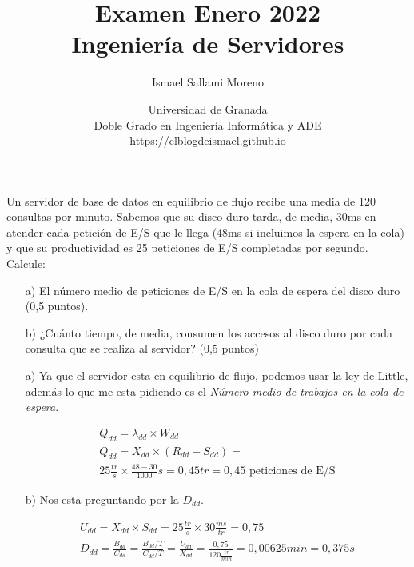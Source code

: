 \documentclass[a4paper,12pt]{article}
\title{\Huge Examen Enero 2022\vspace{0.5cm} \\ \Large Ingeniería de Servidores}
\author{Ismael Sallami Moreno}
\date{\small Universidad de Granada\\ Doble Grado en Ingeniería Informática y ADE\\ \url{https://elblogdeismael.github.io}}
\begin{document}
\maketitle
\thispagestyle{fancy}

\vspace{1cm}

\begin{tcolorbox}[colback=white!95!gray, colframe=black, title=2.- (1 punto)]
Un servidor de base de datos en equilibrio de flujo recibe una media de 120 consultas por minuto. Sabemos que su disco duro tarda, de media, 30ms en atender cada petición de E/S que le llega (48ms si incluimos la espera en la cola) y que su productividad es 25 peticiones de E/S completadas por segundo. Calcule:
\begin{enumerate}
    \item[a)] El número medio de peticiones de E/S en la cola de espera del disco duro (0,5 puntos).
    \item[b)] ¿Cuánto tiempo, de media, consumen los accesos al disco duro por cada consulta que se realiza al servidor? (0,5 puntos)
\end{enumerate}
\end{tcolorbox}

\begin{itemize}
    \item[a)] Ya que el servidor esta en equilibrio de flujo, podemos usar la ley de Little, además lo que me esta pidiendo es el \textit{Número medio de trabajos en la cola de espera}.

    \begin{align*}
        Q_{dd} = \lambda_{dd} \times W_{dd}  \\
        Q_{dd} = X_{dd} \times (R_{dd} - S_{dd}) = \\
        25 \frac{tr}{s} \times \frac{48-30}{1000} s = 0,45 tr =  0,45 \text{ peticiones de E/S}
    \end{align*}

    \item [b)] Nos esta preguntando por la $D_{dd}$.
    
    \begin{align*}
        U_{dd} = X_{dd} \times S_{dd} = 25 \frac{tr}{s} \times 30 \frac{ms}{tr} = 0,75 \\
        D_{dd} = \frac{B_{dd}}{C_{dd}} = \frac{B_{dd}/T}{C_{dd}/T} = \frac{U_{dd}}{X_{dd}} = \frac{0,75}{120 \frac{tr}{min}} = 0,00625 min = 0,375 s
    \end{align*}

\end{itemize}
\end{document}
